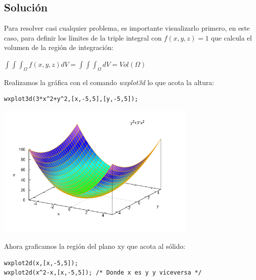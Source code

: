 \documentclass[a4paper]{article}
\begin{document}
\subsection{Solución}

Para resolver casi cualquier problema, es importante visualizarlo primero, en este caso, para definir los límites de la triple integral con $f(x,y,z)=1$ que calcula el volumen de la región de integración:

\begin{center}
$\int \int \int_\Omega f(x,y,z) dV = \int \int \int_\Omega dV = Vol(\Omega)$
\end{center}

Realizamos la gráfica con el comando \textit{wxplot3d} lo que acota la altura:

\begin{verbatim}
wxplot3d(3*x^2+y^2,[x,-5,5],[y,-5,5]);
\end{verbatim}

\begin{center}
\includegraphics[height=6.5cm]{rep9_1_.png}
\end{center}

Ahora graficamos la región del plano xy que acota al sólido:

\begin{verbatim}
wxplot2d(x,[x,-5,5]);
wxplot2d(x^2-x,[x,-5,5]); /* Donde x es y y viceversa */
\end{verbatim}
\end{document}
